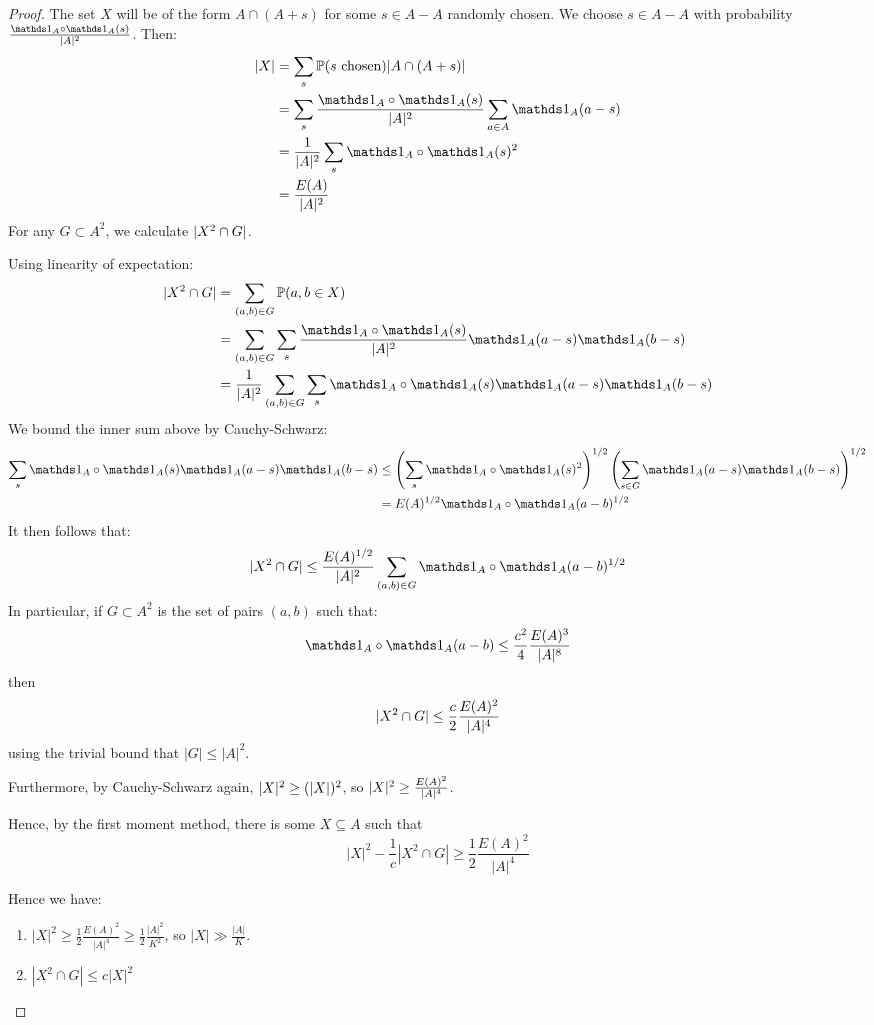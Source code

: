 \documentclass[10pt,a4paper]{article}
\let\E\relax
\DeclareMathOperator*{\E}{\raisebox{-0.45em}{\text{\huge $\mathds{E}$}}}
\begin{document}
\begin{proof}
  The set $X$ will be of the form $A \cap (A+s)$ for some $s \in A-A$ randomly chosen. We choose $s \in A-A$ with probability $\frac{\one_A \circ \one_A(s)}{|A|^2}$. Then:
  \begin{align*}
    \E |X| &= \sum_s \P(s \text{ chosen})|A \cap (A+s)|\\
    &= \sum_s \frac{\one_A\circ \one_A(s)}{|A|^2}\sum_{a \in A}\one_A(a-s)\\
    &= \frac{1}{|A|^2}\sum_s \one_A \circ \one_A(s)^2\\
    &= \frac{E(A)}{|A|^2}
  \end{align*}
  For any $G \subset A^2$, we calculate $\E |X^2 \cap G|$.

  Using linearity of expectation:
  \begin{align*}
    \E |X^2 \cap G| &= \sum_{(a,b) \in G} \P(a,b \in X)\\
    &= \sum_{(a,b) \in G}\sum_s \frac{\one_A\circ \one_A(s)}{|A|^2}\one_A(a-s)\one_A(b-s)\\
    &= \frac{1}{|A|^2}\sum_{(a,b) \in G} \sum_s \one_A \circ \one_A(s)\one_A(a-s)\one_A(b-s)
  \end{align*}
  We bound the inner sum above by Cauchy-Schwarz:
  \begin{align*}
    \sum_s \one_A \circ \one_A(s) \one_A(a-s)\one_A(b-s) & \leq \left(\sum_s \one_A\circ \one_A(s)^2\right)^{1/2}\left(\sum_{s\in G} \one_A(a-s)\one_A(b-s)\right)^{1/2}\\
    &= E(A)^{1/2}\one_A\circ \one_A(a-b)^{1/2}
  \end{align*}
  It then follows that:
  \[\E|X^2\cap G| \leq \frac{E(A)^{1/2}}{|A|^2} \sum_{(a,b)\in G} \one_A \circ \one_A(a-b)^{1/2}\]
  In particular, if $G \subset A^2$ is the set of pairs $(a,b)$ such that:
  \[\one_A \circ \one_A(a-b) \leq \frac{c^2}{4}\frac{E(A)^3}{|A|^8}\]
  then
  \[\E|X^2 \cap G| \leq \frac{c}{2}\frac{E(A)^2}{|A|^4}\]
  using the trivial bound that $|G| \leq |A|^2$.

  Furthermore, by Cauchy-Schwarz again, $\E |X|^2 \geq (\E |X|)^2$, so $\E|X|^2 \geq \frac{E(A)^2}{|A|^4}$.

  Hence, by the first moment method, there is some $X \subseteq A$ such that
  \[|X|^2 -\frac{1}{c}|X^2 \cap G| \geq \frac{1}{2}\frac{E(A)^2}{|A|^4}\]

  Hence we have:
  \begin{enumerate}
    \item $|X|^2 \geq \frac12 \frac{E(A)^2}{|A|^4} \geq \frac12 \frac{|A|^2}{K^2}$, so $|X| \gg \frac{|A|}{K}$.
    \item $|X^2 \cap G| \leq c|X|^2$
  \end{enumerate}
\end{proof}
\end{document}
